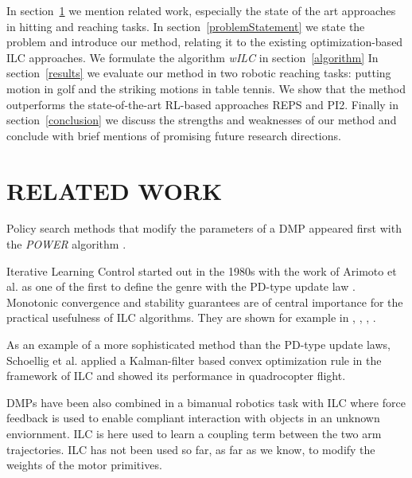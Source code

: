 In section~\ref{relatedWork} we mention related work, especially the state of the art approaches in hitting and reaching tasks. In section~\ref{problemStatement} we state the problem and introduce our method, relating it to the existing optimization-based ILC approaches. We formulate the algorithm \emph{wILC} in section~\ref{algorithm} In section~\ref{results} we evaluate our method in two robotic reaching tasks: putting motion in golf and the striking motions in table tennis. We show that the method outperforms the state-of-the-art RL-based approaches REPS and PI2. Finally in section~\ref{conclusion} we discuss the strengths and weaknesses of our method and conclude with brief mentions of promising future research directions.

\section{RELATED WORK}\label{relatedWork}


Policy search methods that modify the parameters of a DMP appeared first with the \emph{POWER} algorithm \cite{Kober08}.

Iterative Learning Control started out in the 1980s with the work of Arimoto et al. \cite{Arimoto84} as one of the first to define the genre with the PD-type update law \cite{Bristow06}. Monotonic convergence and stability guarantees are of central importance for the practical usefulness of ILC algorithms. They are shown for example in \cite{Bristow06}, \cite{Norrloef02}, \cite{Lee97}, \cite{Longman2000}.

As an example of a more sophisticated method than the PD-type update laws, Schoellig et al. \cite{Schoellig12} applied a Kalman-filter based convex optimization rule in the framework of ILC and showed its performance in quadrocopter flight. 

DMPs have been also combined in a bimanual robotics task with ILC \cite{Gams13} where force feedback is used to enable compliant interaction with objects in an unknown enviornment. ILC is here used to learn a coupling term between the two arm trajectories. ILC has not been used so far, as far as we know, to modify the weights of the motor primitives.
